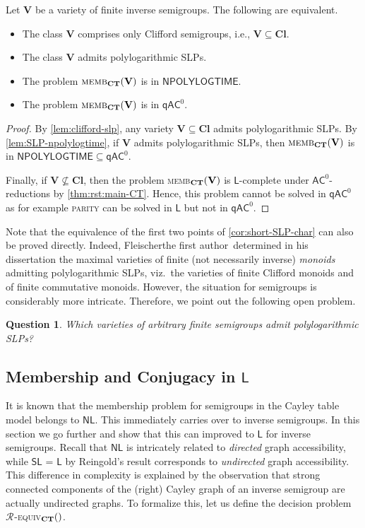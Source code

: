 \documentclass[anonymous,letter,UKenglish,cleveref,autoref,thm-restate]{lipics-v2021}
\newcommand{\sse}{\subseteq}
\newcommand{\NPOLYLOGTIME}{\ensuremath{\mathsf{NPOLYLOGTIME}}\xspace}
\newcommand{\ACz}{\ensuremath{\mathsf{AC}^0}\xspace}
\newcommand{\qACz}{\ensuremath{\mathsf{qAC}^0}\xspace}
\newcommand{\LOGSPACE}{\ensuremath{\mathsf{L}}\xspace}
\newcommand{\NL}{\ensuremath{\mathsf{NL}}\xspace}
\newcommand{\SL}{\ensuremath{\mathsf{SL}}\xspace}
\newcommand{\vV}{\ensuremath{\mathbf{V}}}
\newcommand{\vCl}{\ensuremath{\mathbf{Cl}}}
\newcommand*{\gR}[1][]{\mathrel{\mathcal{R}_{#1}}}
\theoremstyle{plain}
\newtheorem{question}[theorem]{Question}
\theoremstyle{plain}
\newcommand{\dMemb}[2][]{\textup{\textsc{memb${}_{\mathbf{#1}}\expandafter\ifx\expandafter\relax\detokenize{#2}\relax\else(#2)\fi$}}}
\newcommand{\dRequiv}[2][]{\textup{\textsc{\ensuremath{\gR}-equiv${}_{\mathbf{#1}}\expandafter\ifx\expandafter\relax\detokenize{#2}\relax\else(#2)\fi$}}}
\newcommand{\prob}[1]{\textup{\textsc{#1}}\xspace}
\begin{document}
\begin{corollary}\label{cor:short-SLP-char}
  Let $\vV$ be a variety of finite inverse semigroups.
  The following are equivalent.
  \begin{itemize}
    \item The class $\vV$ comprises only Clifford semigroups, i.e., $\vV \sse \vCl$.
    \item The class $\vV$ admits polylogarithmic SLPs.
    \item The problem $\dMemb[CT]{\vV}$ is in \NPOLYLOGTIME.
    \item The problem $\dMemb[CT]{\vV}$ is in \qACz.
  \end{itemize}
\end{corollary}
\begin{proof}
	By \cref{lem:clifford-slp}, any variety $\vV \sse \vCl$ admits polylogarithmic SLPs.
	By \cref{lem:SLP-npolylogtime}, if $\vV$ admits polylogarithmic SLPs, then $\dMemb[CT]{\vV}$ is in $\NPOLYLOGTIME \sse \qACz$.

	Finally, if $\vV \not\sse \vCl$, then the problem \dMemb[CT]{\vV} is \LOGSPACE-complete under \ACz-reductions by \cref{thm:rst:main-CT}. 
	Hence, this problem cannot be solved in \qACz as for example \prob{parity} can be solved in \LOGSPACE but not in \qACz \cite{FurstSS84,Hastad86}.
\end{proof}

Note that the equivalence of the first two points of \cref{cor:short-SLP-char} can also be proved directly. 
Indeed, 
\ifAnonimous Fleischer\else the first author\fi\ 
determined in his dissertation \cite{Fleischer19diss} the maximal varieties of finite (not necessarily inverse) \emph{monoids} admitting polylogarithmic SLPs, viz.\ the varieties of finite Clifford monoids and of finite commutative monoids.
However, the situation for semigroups is considerably more intricate.
Therefore, we point out the following open problem.


\begin{question}
  Which varieties of arbitrary finite semigroups admit polylogarithmic SLPs?
\end{question}


\subsection{Membership and Conjugacy in \LOGSPACE}\label{sec:CT-SL}


It is known that the membership problem for semigroups in the Cayley table model belongs to \NL \cite{JonesLL76}.
This immediately carries over to inverse semigroups.
In this section we go further and show that this can improved to \LOGSPACE for inverse semigroups.
Recall that \NL is intricately related to \emph{directed} graph accessibility, while \SL{} = \LOGSPACE by Reingold's result \cite{Reingold08} corresponds to \emph{undirected} graph accessibility.
This difference in complexity is explained by the observation that strong connected components of the (right) Cayley graph of an inverse semigroup are actually undirected graphs.
To formalize this, let us define the decision problem \dRequiv[CT]{}.
\end{document}
